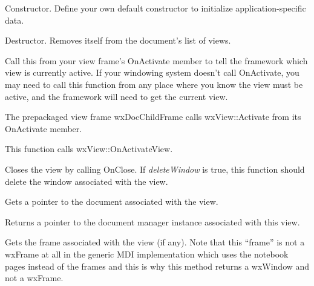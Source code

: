 \label{wxviewctor}


Constructor. Define your own default constructor to initialize application-specific
data.

\label{wxviewdtor}


Destructor. Removes itself from the document's list of views.

\label{wxviewactivate}


Call this from your view frame's OnActivate member to tell the framework which view is
currently active. If your windowing system doesn't call OnActivate, you may need to
call this function from any place where you know the view must
be active, and the framework will need to get the current view.

The prepackaged view frame wxDocChildFrame calls wxView::Activate from its OnActivate member.

This function calls wxView::OnActivateView.

\label{wxviewclose}


Closes the view by calling OnClose. If {\it deleteWindow} is true, this function should
delete the window associated with the view.

\label{wxviewgetdocument}


Gets a pointer to the document associated with the view.

\label{wxviewgetdocumentmanager}


Returns a pointer to the document manager instance associated with this view.

\label{wxviewgetframe}


Gets the frame associated with the view (if any). Note that this ``frame'' is
not a wxFrame at all in the generic MDI implementation which uses the notebook
pages instead of the frames and this is why this method returns a wxWindow and
not a wxFrame.


